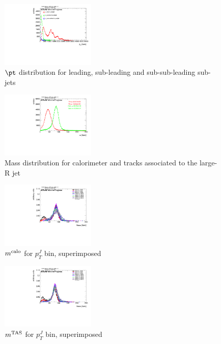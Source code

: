 \begin{figure}
 
\includegraphics[width=0.4\textwidth]{appendixB/mTAS_W_calibmCal_20:07:01-03-11-2016/1cfrt_h_SubJet_pt1.pdf}
\caption{$\pt$ distribution for leading, sub-leading and sub-sub-leading sub-jets}
 
\end{figure}
\begin{figure}
 
\includegraphics[width=0.4\textwidth]{appendixB/mTAS_W_calibmCal_20:07:01-03-11-2016/1cfrt_h_TrackJets_m.pdf}
\caption{Mass distribution for calorimeter and tracks associated to the large-R jet}
 
\end{figure}
 
\begin{figure}
 
\includegraphics[width=0.4\textwidth]{appendixB/mTAS_W_calibmCal_20:07:01-03-11-2016/2cfrt_h_FatJet_ptJ12m_mervM.pdf}
\caption{$m^\textrm{calo}$ for $p_{T}^{J}$ bin, superimposed}
 
\end{figure}
 
\begin{figure}

\includegraphics[width=0.4\textwidth]{appendixB/mTAS_W_calibmCal_20:07:01-03-11-2016/3cfrt_h_FatJet_ptJ12TAm_mervTA.pdf}
\caption{$m^\textrm{TAS}$ for $p_{T}^{J}$ bin, superimposed}

\end{figure}

